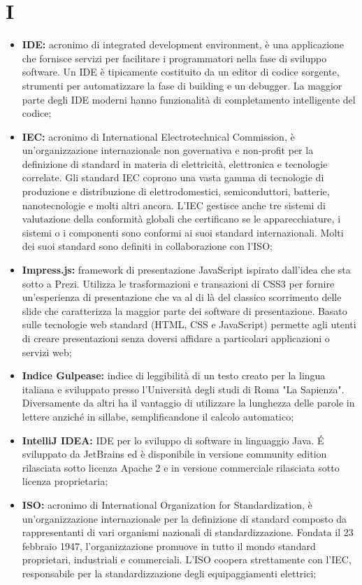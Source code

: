 \section*{\Huge I} %
\label{sec:i}
	\begin{itemize}
		\item \textbf{IDE:} acronimo di integrated development environment, è una applicazione che fornisce servizi per facilitare i programmatori nella fase di sviluppo software. Un IDE è tipicamente costituito da un editor di codice sorgente, strumenti per automatizzare la fase di building e un debugger. La maggior parte degli IDE moderni hanno funzionalità di completamento intelligente del codice;
		\item \textbf{IEC:} acronimo di International Electrotechnical Commission, è un'organizzazione internazionale non governativa e non-profit per la definizione di standard in materia di elettricità, elettronica e tecnologie correlate. Gli standard IEC coprono una vasta gamma di tecnologie di produzione e distribuzione di elettrodomestici, semiconduttori, batterie, nanotecnologie e molti altri ancora. L'IEC gestisce anche tre sistemi di valutazione della conformità globali che certificano se le apparecchiature, i sistemi o i componenti sono conformi ai suoi standard internazionali. Molti dei suoi standard sono definiti in collaborazione con l'ISO;
		\item \textbf{Impress.js:} framework di presentazione JavaScript ispirato dall'idea che sta sotto a Prezi. Utilizza le trasformazioni e transazioni di CSS3 per fornire un'esperienza di presentazione che va al di là del classico scorrimento delle slide che caratterizza la maggior parte dei software di presentazione. Basato sulle tecnologie web standard (HTML, CSS e JavaScript) permette agli utenti di creare presentazioni senza doversi affidare a particolari applicazioni o servizi web;
		\item \textbf{Indice Gulpease:} indice di leggibilità di un testo creato per la lingua italiana e sviluppato presso l'Università degli studi di Roma "La Sapienza". Diversamente da altri ha il vantaggio di utilizzare la lunghezza delle parole in lettere anziché in sillabe, semplificandone il calcolo automatico;
		\item \textbf{IntelliJ IDEA:} IDE per lo sviluppo di software in linguaggio Java. É sviluppato da JetBrains ed è disponibile in versione community edition rilasciata sotto licenza Apache 2 e in versione commerciale rilasciata sotto licenza proprietaria;
		\item \textbf{ISO:} acronimo di International Organization for Standardization, è un'organizzazione internazionale per la definizione di standard composto da rappresentanti di vari organismi nazionali di standardizzazione. Fondata il 23 febbraio 1947, l'organizzazione promuove in tutto il mondo standard proprietari, industriali e commerciali. L'ISO coopera strettamente con l'IEC, responsabile per la standardizzazione degli equipaggiamenti elettrici;
	\end{itemize}
\pagebreak

